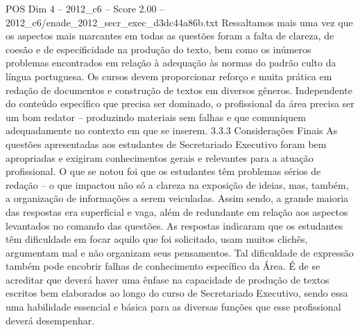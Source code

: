 \begin{textsample}{POS Dim 4 – 2012\_c6 – Score 2.00 – 2012\_c6/enade\_2012\_secr\_exec\_d3dc44a86b.txt}
Ressaltamos mais uma vez que os aspectos mais marcantes em todas as questões foram a falta de clareza, de coesão e de especificidade na produção do texto, bem como os inúmeros problemas encontrados em relação à adequação às normas do padrão culto da língua portuguesa.
Os cursos devem proporcionar reforço e muita prática em redação de documentos e construção de textos em diversos gêneros.
Independente do conteúdo específico que precisa ser dominado, o profissional da área precisa ser um bom redator – produzindo materiais sem falhas e que comuniquem adequadamente no contexto em que se inserem. 3.3.3 Considerações Finais As questões apresentadas aos estudantes de Secretariado Executivo foram bem apropriadas e exigiram conhecimentos gerais e relevantes para a atuação profissional.
O que se notou foi que os estudantes têm problemas sérios de redação – o que impactou não só a clareza na exposição de ideias, mas, também, a organização de informações a serem veiculadas.
Assim sendo, a grande maioria das respostas era superficial e vaga, além de redundante em relação aos aspectos levantados no comando das questões.
As respostas indicaram que os estudantes têm dificuldade em focar aquilo que foi solicitado, usam muitos clichês, argumentam mal e não organizam seus pensamentos.
Tal dificuldade de expressão também pode encobrir falhas de conhecimento específico da Área.
É de se acreditar que deverá haver uma ênfase na capacidade de produção de textos escritos bem elaborados ao longo do curso de Secretariado Executivo, sendo essa uma habilidade essencial e básica para as diversas funções que esse profissional deverá desempenhar.

\end{textsample}
